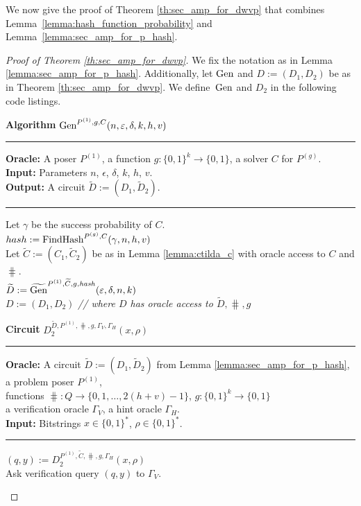 %
We now give the proof of Theorem \ref{th:sec_amp_for_dwvp} that combines Lemma~\ref{lemma:hash_function_probability} and Lemma~\ref{lemma:sec_amp_for_p_hash}.
\begin{proof}[Proof of Theorem \ref{th:sec_amp_for_dwvp}]
  We fix the notation as in Lemma \ref{lemma:sec_amp_for_p_hash}.
  Additionally, let $\operatorname{\text{Gen}}$ and $D := (D_1, D_2)$ be as in Theorem \ref{th:sec_amp_for_dwvp}.
  We define~$\operatorname{\text{Gen}}$ and $D_2$ in the following code listings.
%
\begin{codeblock}
  \textbf{Algorithm} $\operatorname{\text{Gen}}^{P^{(1)}, g, C}(n, \varepsilon, \delta, k, h, v)$
  \medskip\hrule
  \textbf{Oracle:} A poser $P^{(1)}$, a function $g: \{0,1\}^{k} \rightarrow \{0,1\}$, a solver $C$ for $P^{(g)}$.  \\
  \textbf{Input:} Parameters $n$, $\epsilon$, $\delta$, $k$, $h$, $v$.\\
  \textbf{Output:} A circuit $\widetilde{D} := (D_1, \widetilde{D}_2)$.
  \medskip\hrule
  Let $\gamma$ be the success probability of $C$.\\
  $hash := \operatorname{\text{FindHash}}^{P^{(g)}, C}(\gamma, n, h, v)$ \\
  Let $\widetilde{C} := (C_1, \widetilde{C}_2)$ be as in Lemma \ref{lemma:ctilda_c} with oracle access to $C$ and $\hash$. \\
  $\widetilde{D} := \widetilde{\operatorname{\text{Gen}}}^{P^{(1)},  \widetilde{C},  g, \operatorname{\mathit{hash}}}(\varepsilon, \delta, n, k)$ \\
  \Return $D := (D_1, D_2)$ \textit{// where $D$ has oracle access to $\widetilde{D}, \hash, g$}
\end{codeblock}
%
\begin{codeblock}
  \textbf{Circuit} $D_2^{\widetilde{D}, P^{(1)}, \hash, g, \Gamma_V, \Gamma_H}(x, \rho)$
  \medskip \hrule
  \textbf{Oracle:} A circuit $\widetilde{D} :=(D_1, \widetilde{D}_2)$ from Lemma \ref{lemma:sec_amp_for_p_hash}, a problem poser $P^{(1)}$, \\
  \IndII functions $\hash: Q \rightarrow \{0,1, \dots, 2(h+v) - 1\}$, $g: \{0,1\}^{k} \rightarrow \{0,1\}$ \\
  \IndII a verification oracle $\Gamma_V$, a hint oracle $\Gamma_H$.\\
  \textbf{Input:}  Bitstrings $x \in \{0,1\}^{*}$, $\rho \in \{0,1\}^{*}$.
  \medskip\hrule
  $(q, y) := D_2^{P^{(1)}, \widetilde{C}, \hash, g, \Gamma_H}(x, \rho)$ \\
  Ask verification query $(q,y)$ to $\Gamma_V$.
\end{codeblock}
%

\end{proof}
